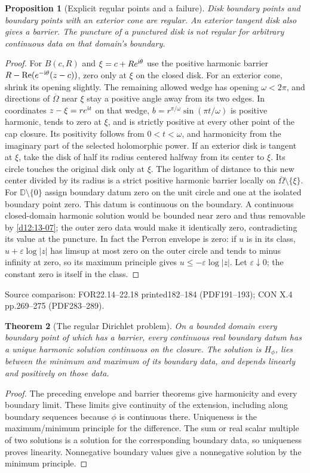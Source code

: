 \documentclass[11pt,a4paper,openany]{book}
\newtheorem{theorem}{Theorem}[chapter]
\newtheorem{proposition}[theorem]{Proposition}
\theoremstyle{definition}
\theoremstyle{remark}\newtheorem{remark}[theorem]{Remark}
\newcommand{\D}{\mathbb D}\newcommand{\Chat}{\widehat{\mathbb C}}
\newcommand{\eps}{\varepsilon}\newcommand{\ee}{\varepsilon}
\DeclareMathOperator{\Ree}{Re}\DeclareMathOperator{\Imm}{Im}
\newcommand{\family}[1]{}
\newcommand{\source}[1]{\par\begingroup\small\sffamily\color{black!65}Source comparison: #1\par\endgroup}
\begin{document}
\begin{proposition}[Explicit regular points and a failure]\family{D12.14.05}\label{d12:14-05}
Disk boundary points and boundary points with an exterior cone are regular. An exterior tangent disk also gives a barrier. The puncture of a punctured disk is not regular for arbitrary continuous data on that domain's boundary.
\end{proposition}
\begin{proof}
For $B(c,R)$ and $\xi=c+Re^{\mathrm i\theta}$ use the positive harmonic barrier $R-\Ree(e^{-\iu\theta}(z-c))$, zero only at $\xi$ on the closed disk. For an exterior cone, shrink its opening slightly. The remaining allowed wedge has opening $\omega<2\pi$, and directions of $\overline\Omega$ near $\xi$ stay a positive angle away from its two edges. In coordinates $z-\xi=re^{\mathrm i t}$ on that wedge,
$b=r^{\pi/\omega}\sin(\pi t/\omega)$ is positive harmonic, tends to zero at $\xi$, and is strictly positive at every other point of the cap closure. Its positivity follows from $0<t<\omega$, and harmonicity from the imaginary part of the selected holomorphic power. If an exterior disk is tangent at $\xi$, take the disk of half its radius centered halfway from its center to $\xi$. Its circle touches the original disk only at $\xi$. The logarithm of distance to this new center divided by its radius is a strict positive harmonic barrier locally on $\overline\Omega\setminus\{\xi\}$.
For $\D\setminus\{0\}$ assign boundary datum zero on the unit circle and one at the isolated boundary point zero. This datum is continuous on the boundary. A continuous closed-domain harmonic solution would be bounded near zero and thus removable by \cref{d12:13-07}; the outer zero data would make it identically zero, contradicting its value at the puncture. In fact the Perron envelope is zero: if $u$ is in its class, $u+\eps\log|z|$ has limsup at most zero on the outer circle and tends to minus infinity at zero, so its maximum principle gives $u\le-\eps\log|z|$. Let $\eps\downarrow0$; the constant zero is itself in the class.
\end{proof}
\source{FOR22.14--22.18 printed182--184 (PDF191--193); CON X.4 pp.269--275 (PDF283--289).}

\begin{theorem}[The regular Dirichlet problem]\family{D12.14.06}\label{d12:14-06}
On a bounded domain every boundary point of which has a barrier, every continuous real boundary datum has a unique harmonic solution continuous on the closure. The solution is $H_\phi$, lies between the minimum and maximum of its boundary data, and depends linearly and positively on those data.
\end{theorem}
\begin{proof}
The preceding envelope and barrier theorems give harmonicity and every boundary limit. These limits give continuity of the extension, including along boundary sequences because $\phi$ is continuous there. Uniqueness is the maximum/minimum principle for the difference. The sum or real scalar multiple of two solutions is a solution for the corresponding boundary data, so uniqueness proves linearity. Nonnegative boundary values give a nonnegative solution by the minimum principle.
\end{proof}
\end{document}
